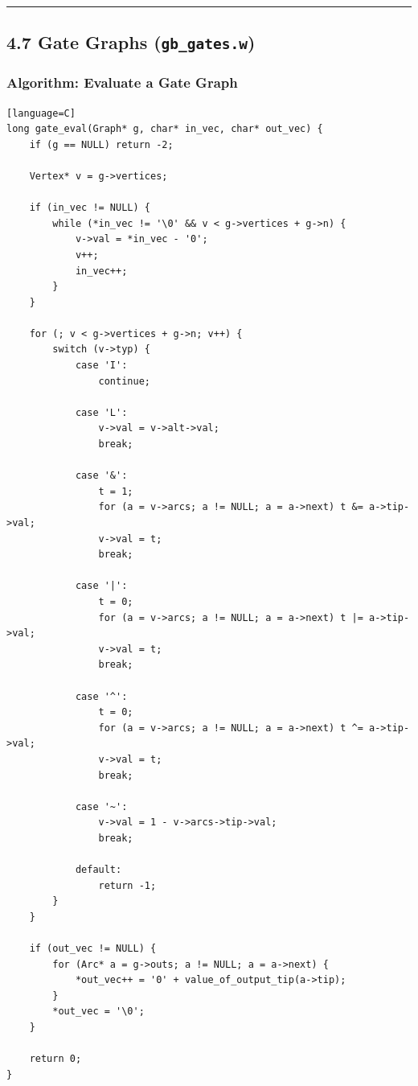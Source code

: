 \documentclass[11pt]{article}
\begin{document}
\begin{center}\rule{0.5\linewidth}{0.5pt}\end{center}

\subsection{\texorpdfstring{4.7 Gate Graphs (\texttt{gb\_gates.w})}{4.7 Gate Graphs (gb\_gates.w)}}\label{gate-graphs-gb_gates.w}

\subsubsection{Algorithm: Evaluate a Gate Graph}\label{algorithm-evaluate-a-gate-graph}

\begin{verbatim}[language=C]
long gate_eval(Graph* g, char* in_vec, char* out_vec) {
    if (g == NULL) return -2;

    Vertex* v = g->vertices;

    if (in_vec != NULL) {
        while (*in_vec != '\0' && v < g->vertices + g->n) {
            v->val = *in_vec - '0';
            v++;
            in_vec++;
        }
    }

    for (; v < g->vertices + g->n; v++) {
        switch (v->typ) {
            case 'I':
                continue;

            case 'L':
                v->val = v->alt->val;
                break;

            case '&':
                t = 1;
                for (a = v->arcs; a != NULL; a = a->next) t &= a->tip->val;
                v->val = t;
                break;

            case '|':
                t = 0;
                for (a = v->arcs; a != NULL; a = a->next) t |= a->tip->val;
                v->val = t;
                break;

            case '^':
                t = 0;
                for (a = v->arcs; a != NULL; a = a->next) t ^= a->tip->val;
                v->val = t;
                break;

            case '~':
                v->val = 1 - v->arcs->tip->val;
                break;

            default:
                return -1;
        }
    }

    if (out_vec != NULL) {
        for (Arc* a = g->outs; a != NULL; a = a->next) {
            *out_vec++ = '0' + value_of_output_tip(a->tip);
        }
        *out_vec = '\0';
    }

    return 0;
}
\end{verbatim}
\end{document}
